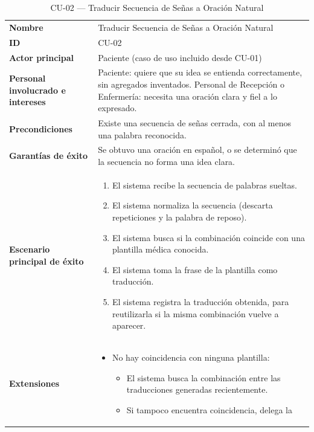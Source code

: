 \begin{longtable}{@{}>{\raggedright\arraybackslash}p{4.1cm} >{\raggedright\arraybackslash}p{\dimexpr\textwidth-4.1cm-2\tabcolsep\relax}@{}}
\caption{CU-02 --- Traducir Secuencia de Señas a Oración Natural}\\
\toprule
\textbf{Nombre} & Traducir Secuencia de Señas a Oración Natural \\
\textbf{ID} & CU-02 \\
\textbf{Actor principal} & Paciente (caso de uso incluido desde CU-01) \\
\textbf{Personal involucrado e intereses} &
Paciente: quiere que su idea se entienda correctamente, sin agregados
inventados. \newline
Personal de Recepción o Enfermería: necesita una oración clara y fiel a lo
expresado. \\
\textbf{Precondiciones} &
Existe una secuencia de señas cerrada, con al menos una palabra
reconocida. \\
\textbf{Garantías de éxito} &
Se obtuvo una oración en español, o se determinó que la secuencia no
forma una idea clara. \\
\textbf{Escenario principal de éxito} &
\begin{enumerate}[leftmargin=*, itemsep=2pt]
    \item El sistema recibe la secuencia de palabras sueltas.
    \item El sistema normaliza la secuencia (descarta repeticiones y la
    palabra de reposo).
    \item El sistema busca si la combinación coincide con una plantilla
    médica conocida.
    \item El sistema toma la frase de la plantilla como traducción.
    \item El sistema registra la traducción obtenida, para reutilizarla si
    la misma combinación vuelve a aparecer.
\end{enumerate} \\
\textbf{Extensiones} &
\begin{itemize}[leftmargin=*, itemsep=2pt]
    \item[3a.] No hay coincidencia con ninguna plantilla:
    \begin{itemize}[leftmargin=*, itemsep=2pt]
        \item[3a1.] El sistema busca la combinación entre las traducciones
        generadas recientemente.
        \item[3a2.] Si tampoco encuentra coincidencia, delega la

\end{itemize}
\end{itemize}
\end{longtable}
